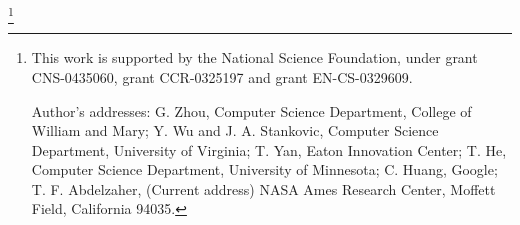 \documentclass[format=acmsmall, review=false, screen=true]{acmart}
\begin{document}
\thanks{This work is supported by the National Science Foundation,
  under grant CNS-0435060, grant CCR-0325197 and grant EN-CS-0329609.

  Author's addresses: G. Zhou, Computer Science Department, College of
  William and Mary; Y. Wu {and} J. A. Stankovic, Computer Science
  Department, University of Virginia; T. Yan, Eaton Innovation Center;
  T. He, Computer Science Department, University of Minnesota; C.
  Huang, Google; T. F. Abdelzaher, (Current address) NASA Ames
  Research Center, Moffett Field, California 94035.}


\maketitle

\renewcommand{\shortauthors}{G. Zhou et al.}

\newcommand*{\PartialPath}{../partial}
\newcommand*{\GraphicPath}{../graphics}
\newcommand*{\AlgoPath}{../algorithms}
\newcommand*{\FormulaPath}{../formulas}
\newcommand*{\CodePath}{../codes}
\newcommand*{\TablePath}{../tables}













%

%

%

%

\nocite{Rahman2006AlgorithmsFC}
\nocite{Peng2011TheLC}
\nocite{Hasan2010CacheOA}
\nocite{Gabow1983ALA}
\nocite{Fischer2007ANS}



\end{document}
